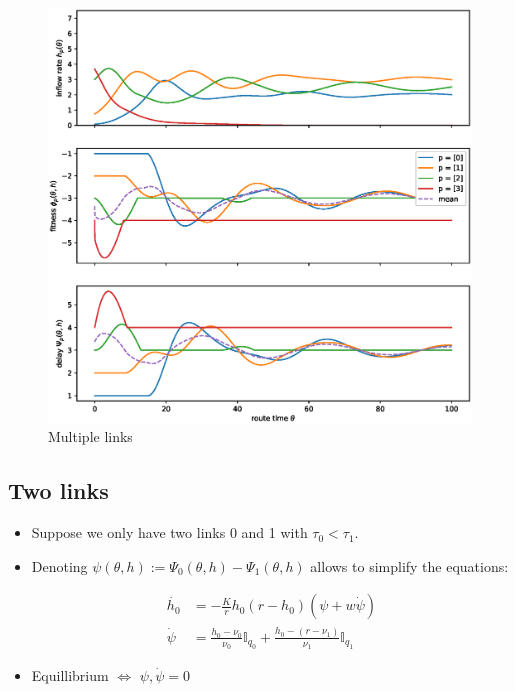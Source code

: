 \documentclass[10pt]{beamer}
\begin{document}
\begin{frame}

	\begin{center}
		\begin{figure}
			\includegraphics[scale=0.3]{img/pres-replicator_more_links.eps}
			\caption{Multiple links}	
		\end{figure}	  
	\end{center}  
  

\end{frame}



\subsection{Two links}

\begin{frame}

\begin{itemize}

\item Suppose we only have two links 0 and 1 with $\tau_0 < \tau_1$. 

\item Denoting $ \psi(\theta, h) := \Psi_0(\theta, h) - \Psi_1(\theta, h) $ allows to simplify the equations:

\begin{align*}
	\dot{h_0} &= - \frac{K}{r} h_0 (r - h_0) ( \psi + w \dot{\psi} ) \\
	\dot{\psi} &= \frac{h_0 - \nu_0}{\nu_0} \mathbb{I}_{q_0} + \frac{ h_0  - (r - \nu_1)}{\nu_1} \mathbb{I}_{q_1}
\end{align*}


\item Equillibrium  $\Leftrightarrow$  $ \psi, \dot{\psi} = 0$


\end{itemize}


\end{frame}
\end{document}
